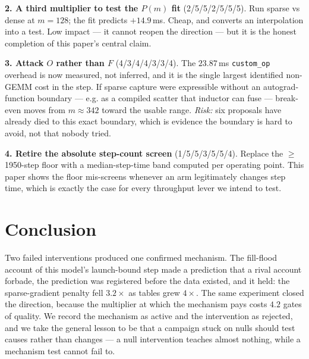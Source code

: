 \documentclass{article}
\begin{document}
\textbf{2. A third multiplier to test the $P(m)$ fit} (2/5/5/2/5/5/5). Run sparse vs dense at $m{=}128$; the fit predicts $+14.9$\,ms. Cheap, and converts an interpolation into a test. Low impact --- it cannot reopen the direction --- but it is the honest completion of this paper's central claim.

\textbf{3. Attack $O$ rather than $F$} (4/3/4/4/3/3/4). The $23.87$\,ms \texttt{custom\_op} overhead is now measured, not inferred, and it is the single largest identified non-GEMM cost in the step. If sparse capture were expressible without an autograd-function boundary --- e.g. as a compiled scatter that inductor can fuse --- break-even moves from $m\approx342$ toward the usable range. \emph{Risk:} six proposals have already died to this exact boundary, which is evidence the boundary is hard to avoid, not that nobody tried.

\textbf{4. Retire the absolute step-count screen} (1/5/5/3/5/5/4). Replace the $\ge$1950-step floor with a median-step-time band computed per operating point. This paper shows the floor mis-screens whenever an arm legitimately changes step time, which is exactly the case for every throughput lever we intend to test.

\section{Conclusion}
Two failed interventions produced one confirmed mechanism. The fill-flood account of this model's launch-bound step made a prediction that a rival account forbade, the prediction was registered before the data existed, and it held: the sparse-gradient penalty fell $3.2\times$ as tables grew $4\times$. The same experiment closed the direction, because the multiplier at which the mechanism pays costs $4.2$ gates of quality. We record the mechanism as active and the intervention as rejected, and we take the general lesson to be that a campaign stuck on nulls should test causes rather than changes --- a null intervention teaches almost nothing, while a mechanism test cannot fail to.
\end{document}
